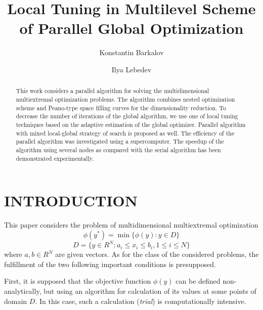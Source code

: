 \documentclass{aip-cp}
\begin{document}
\title{Local Tuning in Multilevel Scheme of Parallel Global Optimization}

\author[aff1]{Konstantin Barkalov}
\author[aff1]{Ilya Lebedev}


\maketitle

\begin{abstract}
This work considers a parallel algorithm for solving the multidimensional multiextremal optimization problems. The algorithm combines nested optimization scheme and Peano-type space filling curves for the dimensionality reduction. To decrease the number of iterations of the global algorithm, we use one of local tuning techniques based on the adaptive estimation of the global optimizer. Parallel algorithm with mixed local-global strategy of search is proposed as well. The efficiency of the parallel algorithm was investigated using a supercomputer. The speedup of the algorithm using several nodes as compared with the serial algorithm has been demonstrated experimentally.
\end{abstract}

\section{INTRODUCTION}

This paper considers the problem of multidimensional multiextremal optimization
\begin{displaymath}
\phi(y^*)=\min\{\phi(y):y\in D\}
\end{displaymath}
\begin{displaymath}
D=\{y\in R^N:a_i\leqslant x_i\leqslant{b_i}, 1\leqslant{i}\leqslant{N}\}
\end{displaymath}
where $a,b \in R^N$ are given vectors. As for the class of the considered problems, the fulfillment of the two following important conditions is presupposed.

First, it is supposed that the objective function $\phi(y)$ can be defined non-analytically, but using an algorithm for calculation of its values at some points of domain $D$. In this case, such a calculation (\textit{trial}) is computationally intensive.
\end{document}
